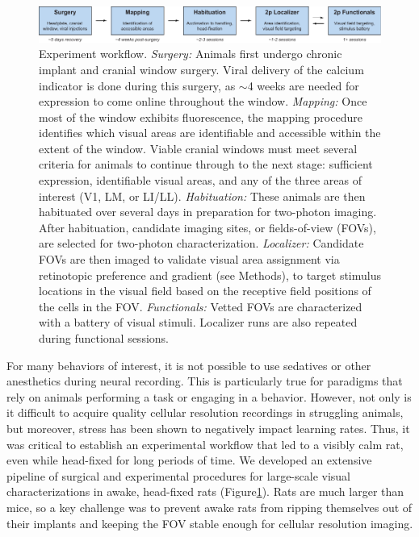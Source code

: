 \begin{figure}[t!]
    \includegraphics[width=\textwidth]{figures/chapter_2/fig_2-2_experiment_workflow/fig_2-2_experiment_workflow.pdf}
    \vspace{.1in}
    \caption[Experiment workflow]{Experiment workflow. 
    \textit{Surgery:} Animals first undergo chronic implant and cranial window surgery. Viral delivery of the calcium indicator is done during this surgery, as $\sim$4 weeks are needed for expression to come online throughout the window.
    \textit{Mapping:} Once most of the window exhibits fluorescence, the mapping procedure identifies which visual areas are identifiable and accessible within the extent of the window. Viable cranial windows must meet several criteria for animals to continue through to the next stage: sufficient expression, identifiable visual areas, and any of the three areas of interest (V1, LM, or LI/LL). \textit{Habituation:} These animals are then habituated over several days in preparation for two-photon imaging. After habituation, candidate imaging sites, or fields-of-view (FOVs), are selected for two-photon characterization. \textit{Localizer:} Candidate FOVs are then imaged to validate visual area assignment via retinotopic preference and gradient (see Methods), to target stimulus locations in the visual field based on the receptive field positions of the cells in the FOV. 
    \textit{Functionals:} Vetted FOVs are characterized with a battery of visual stimuli. Localizer runs are also repeated during functional sessions. 
    \label{fig:experiment_workflow}}
\end{figure}

For many behaviors of interest, it is not possible to use sedatives or other anesthetics during neural recording. This is particularly true for paradigms that rely on animals performing a task or engaging in a behavior. However, not only is it difficult to acquire quality cellular resolution recordings in struggling animals, but moreover, stress has been shown to negatively impact learning rates. Thus, it was critical to establish an experimental workflow that led to a visibly calm rat, even while head-fixed for long periods of time. We developed an extensive pipeline of surgical and experimental procedures for large-scale visual characterizations in awake, head-fixed rats (Figure\ref{fig:experiment_workflow}). Rats are much larger than mice, so a key challenge was to prevent awake rats from ripping themselves out of their implants and keeping the FOV stable enough for cellular resolution imaging. 

